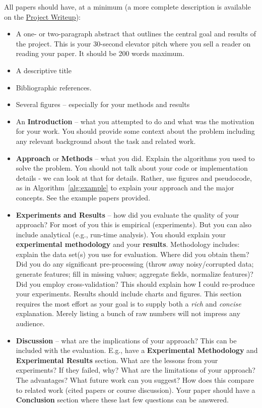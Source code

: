 \documentclass{article}
\begin{document}
All papers should have, at a minimum (a more complete description is
available on the \href{https://www.cs.swarthmore.edu/courses/CS66/S21/finalProject/}{Project Writeup}):
\begin{itemize}
  \item A one- or two-paragraph abstract that outlines the central goal and
    results of the project.  This is your 30-second elevator pitch where you
    sell a reader on reading your paper.  It should be 200 words maximum.
  \item A descriptive title
  \item Bibliographic references.
  \item Several figures -- especially for your methods and results
  \item An {\bf Introduction} -- what you attempted to do and what
    was the motivation for your work. You should provide some context about the problem
    including any relevant background about the task and related work.
  \item   {\bf Approach} or {\bf Methods} -- what you did.  Explain the algorithms
  you used to solve the problem.  You should not talk about your code or implementation details -
  we can look at that for details.
    Rather, use figures and pseudocode, as in Algorithm~\ref{alg:example} to explain your
    approach and the major concepts.  See the example papers provided.
  \item {\bf Experiments and Results} -- how did you evaluate the quality of your approach?
    For most of you this is empirical (experiments).  But you can also
    include analytical (e.g., run-time analysis).  You should explain
    your {\bf experimental methodology} and your {\bf results}.
    Methodology includes: explain the data set(s) you use for evaluation.
    Where did you obtain them? Did you do any significant pre-processing (throw
    away noisy/corrupted data; generate features; fill in missing values;
    aggregate fields, normalize features)?  Did you employ cross-validation? This
    should explain how I could re-produce your experiments.  Results
    should include charts and figures.  This section requires the most effort
    as your goal is to supply both a {\it rich} and {\it concise} explanation.
    Merely listing a bunch of raw numbers will not impress any audience.
  \item {\bf Discussion} -- what are the implications of your approach?  This
    can be included with the evaluation.  E.g., have a {\bf Experimental Methodology}
    and {\bf Experimental Results} section.  What are the lessons from your
    experiments?  If they failed, why? What are the limitations of your approach?
    The advantages?  What future work can you suggest?  How does this compare
    to related work (cited papers or course discussion).  Your paper should
    have a {\bf Conclusion} section where these last few questions can be answered.
\end{itemize}
\end{document}
